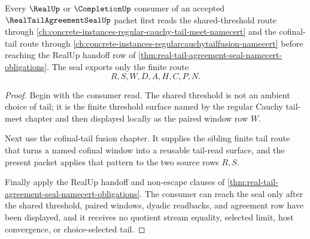 \begin{theorem}
\label{thm:real-tail-agreement-seal-realup-consumer-threshold-factorization}
Every $\RealUp$ or $\CompletionUp$ consumer of an accepted $\RealTailAgreementSealUp$ packet first reads the shared-threshold route through \autoref{ch:concrete-instances-regular-cauchy-tail-meet-namecert} and the cofinal-tail route through \autoref{ch:concrete-instances-regularcauchytailfusion-namecert} before reaching the RealUp handoff row of \autoref{thm:real-tail-agreement-seal-namecert-obligations}. The seal exports only the finite route
$$
R,S,W,D,A,H,C,P,N.
$$
\end{theorem}
\begin{proof}
Begin with the consumer read. The shared threshold is not an ambient choice of tail; it is the finite threshold surface named by the regular Cauchy tail-meet chapter and then displayed locally as the paired window row $W$.

Next use the cofinal-tail fusion chapter. It supplies the sibling finite tail route that turns a named cofinal window into a reusable tail-read surface, and the present packet applies that pattern to the two source rows $R,S$.

Finally apply the RealUp handoff and non-escape clauses of \autoref{thm:real-tail-agreement-seal-namecert-obligations}. The consumer can reach the seal only after the shared threshold, paired windows, dyadic readbacks, and agreement row have been displayed, and it receives no quotient stream equality, selected limit, host convergence, or choice-selected tail.
\end{proof}

